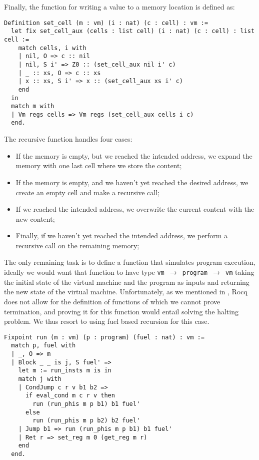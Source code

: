 Finally, the function for writing a value to a memory location is defined as:

\begin{lstlisting}[style=Rocq]
Definition set_cell (m : vm) (i : nat) (c : cell) : vm :=
  let fix set_cell_aux (cells : list cell) (i : nat) (c : cell) : list cell :=
    match cells, i with
    | nil, O => c :: nil
    | nil, S i' => Z0 :: (set_cell_aux nil i' c)
    | _ :: xs, O => c :: xs
    | x :: xs, S i' => x :: (set_cell_aux xs i' c)
    end
  in
  match m with
  | Vm regs cells => Vm regs (set_cell_aux cells i c)
  end.
\end{lstlisting}

The recursive function handles four cases:
\begin{itemize}
  \item If the memory is empty, but we reached the intended address, we expand the memory with one last cell where we store the content;
  \item If the memory is empty, and we haven't yet reached the desired address, we create an empty cell and make a recursive call;
  \item If we reached the intended address, we overwrite the current content with the new content;
  \item Finally, if we haven't yet reached the intended address, we perform a recursive call on the remaining memory;
\end{itemize}

The only remaining task is to define a function that simulates program execution, ideally we would want that function to have type \texttt{vm $\to$ program $\to$ vm} taking the initial state of the virtual machine and the program as inputs and returning the new state of the virtual machine.
Unfortunately, as we mentioned in , Rocq does not allow for the definition of functions of which we cannot prove termination, and proving it for this function would entail solving the halting problem. We thus resort to using fuel based recursion for this case.

\begin{lstlisting}[style=Rocq]
Fixpoint run (m : vm) (p : program) (fuel : nat) : vm :=
  match p, fuel with
  | _, O => m
  | Block _ _ is j, S fuel' =>
    let m := run_insts m is in
    match j with
    | CondJump c r v b1 b2 =>
      if eval_cond m c r v then
        run (run_phis m p b1) b1 fuel'
      else
        run (run_phis m p b2) b2 fuel'
    | Jump b1 => run (run_phis m p b1) b1 fuel'
    | Ret r => set_reg m 0 (get_reg m r)
    end
  end.
\end{lstlisting}

